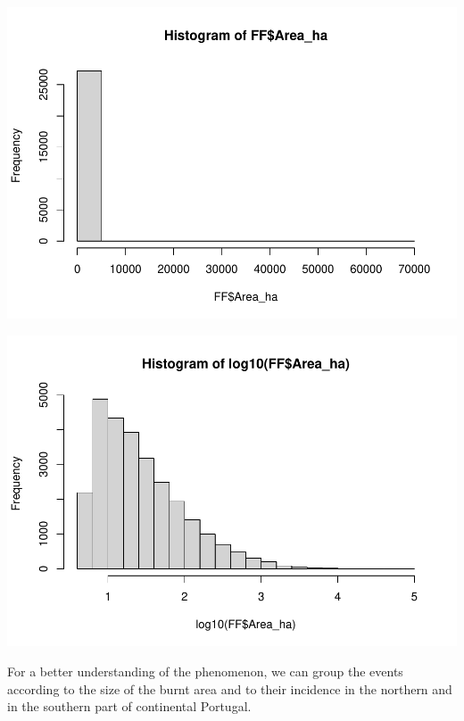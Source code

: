 \documentclass[
]{book}
\newenvironment{Shaded}{\begin{snugshade}}{\end{snugshade}}
\newcommand{\CommentTok}[1]{\textcolor[rgb]{0.56,0.35,0.01}{\textit{#1}}}
\newcommand{\FunctionTok}[1]{\textcolor[rgb]{0.13,0.29,0.53}{\textbf{#1}}}
\newcommand{\NormalTok}[1]{#1}
\newcommand{\SpecialCharTok}[1]{\textcolor[rgb]{0.81,0.36,0.00}{\textbf{#1}}}
\begin{document}
\includegraphics{03-KDE_files/figure-latex/import-data-1.pdf}

\begin{Shaded}
\end{Shaded}

\includegraphics{03-KDE_files/figure-latex/import-data-2.pdf}

For a better understanding of the phenomenon, we can group the events according to the size of the burnt area and to their incidence in the northern and in the southern part of continental Portugal.
\end{document}
